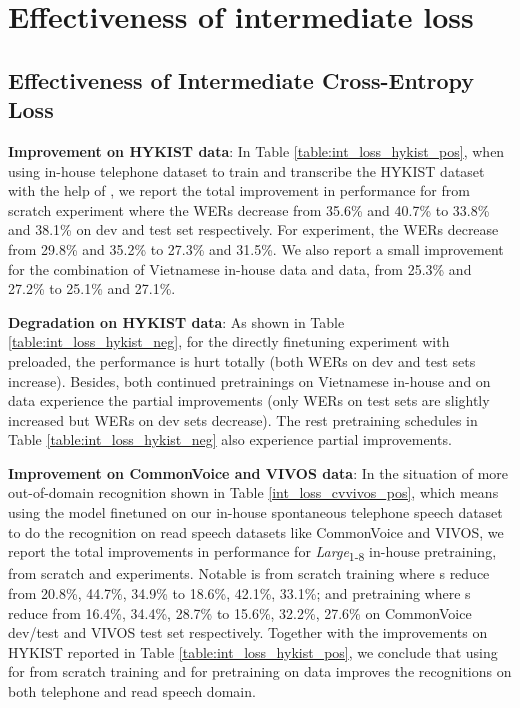 \section{Effectiveness of intermediate loss}


\subsection{Effectiveness of Intermediate Cross-Entropy Loss}

%
%

\textbf{Improvement on HYKIST data}: In Table \ref{table:int_loss_hykist_pos}, when using in-house telephone dataset to train and transcribe the HYKIST dataset with the help of , we report the total improvement in performance for from scratch experiment where the \Glspl{WER} decrease from 35.6\% and 40.7\% to 33.8\% and 38.1\% on dev and test set respectively.
For  experiment, the \Glspl{WER} decrease from 29.8\% and 35.2\% to 27.3\% and 31.5\%.
We also report a small improvement for the combination of Vietnamese in-house data and  data, from 25.3\% and 27.2\% to 25.1\% and 27.1\%.



\textbf{Degradation on HYKIST data}: As shown in Table \ref{table:int_loss_hykist_neg}, for the directly finetuning experiment with  preloaded, the performance is hurt totally (both \Glspl{WER} on dev and test sets increase).
Besides, both continued pretrainings on Vietnamese in-house and on  data experience the partial improvements (only \Glspl{WER} on test sets are slightly increased but \Glspl{WER} on dev sets decrease).
The rest pretraining schedules in Table \ref{table:int_loss_hykist_neg} also experience partial improvements.



\textbf{Improvement on CommonVoice and VIVOS data}: In the situation of more out-of-domain recognition shown in Table \ref{int_loss_cvvivos_pos}, which means using the model finetuned on our in-house spontaneous telephone speech dataset to do the recognition on read speech datasets like CommonVoice and VIVOS, we report the total improvements in performance for \textit{Large}\textsubscript{1-8} in-house pretraining, from scratch and  experiments. 
Notable is from scratch training where s reduce from 20.8\%, 44.7\%, 34.9\% to 18.6\%, 42.1\%, 33.1\%; and  pretraining where s reduce from 16.4\%, 34.4\%, 28.7\% to 15.6\%, 32.2\%, 27.6\% on CommonVoice dev/test and VIVOS test set respectively.
Together with the improvements on HYKIST reported in Table \ref{table:int_loss_hykist_pos}, we conclude that using  for from scratch training and for pretraining on  data improves the recognitions on both telephone and read speech domain.

